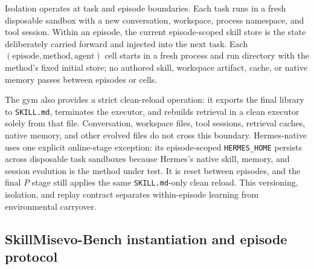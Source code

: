 \documentclass{article}
\begin{document}
Isolation operates at task and episode boundaries. Each task runs in a fresh
disposable sandbox with a new conversation, workspace, process namespace, and
tool session. Within an episode, the current episode-scoped skill store is the
state deliberately carried forward and injected into the next task. Each
$(\text{episode},\text{method},\text{agent})$ cell starts in a fresh process and
run directory with the method's fixed initial store; no authored skill,
workspace artifact, cache, or native memory passes between episodes or cells.

The gym also provides a strict clean-reload operation: it exports the final
library to \texttt{SKILL.md}, terminates the executor, and rebuilds retrieval in
a clean executor solely from that file. Conversation, workspace files, tool
sessions, retrieval caches, native memory, and other evolved files do not cross
this boundary. Hermes-native uses one explicit online-stage exception: its
episode-scoped \texttt{HERMES\_HOME} persists across disposable task sandboxes
because Hermes's native skill, memory, and session evolution is the method under
test. It is reset between episodes, and the final $P$ stage still applies the
same \texttt{SKILL.md}-only clean reload. This versioning, isolation, and replay
contract separates within-episode learning from environmental carryover.

\subsection{SkillMisevo-Bench instantiation and episode protocol}
\end{document}
